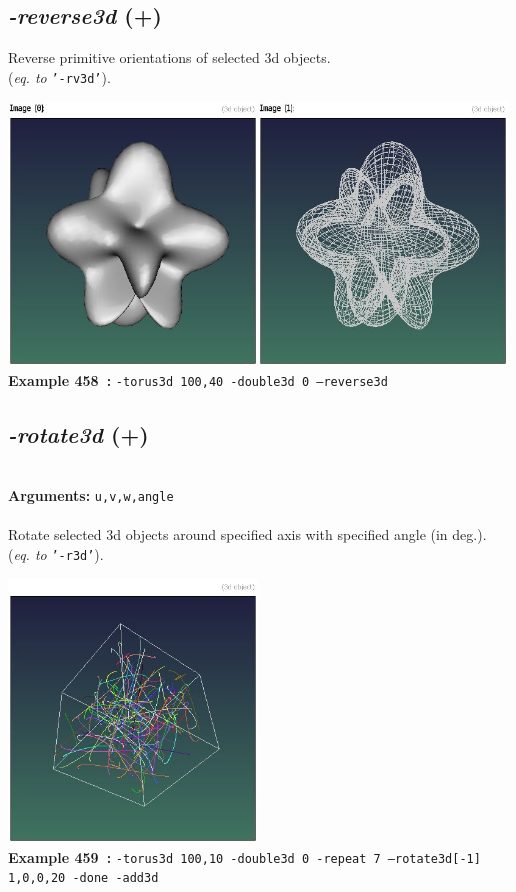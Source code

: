 \documentclass[a4paper,11pt,twoside]{book}
\begin{document}
\subsection{\emph{-reverse3d} (+)}\vspace*{-0.5em}
Reverse primitive orientations of selected 3d objects.
~\\(\emph{eq. to} {\small \texttt{'-rv3d'}}).
\begin{center}\includegraphics[keepaspectratio=true,height=7cm,width=\textwidth]{img/gmic_def458.jpg}\\
{\footnotesize \textbf{Example 458~:} \texttt{-torus3d 100,40 -double3d 0 --reverse3d}}
\end{center}

\subsection{\emph{-rotate3d} (+)}\vspace*{-0.5em}
~\\\textbf{Arguments: } 
{\small \texttt{u,v,w,angle}}\\~\\
Rotate selected 3d objects around specified axis with specified angle (in deg.).
~\\(\emph{eq. to} {\small \texttt{'-r3d'}}).
\begin{center}\includegraphics[keepaspectratio=true,height=7cm,width=\textwidth]{img/gmic_def459.jpg}\\
{\footnotesize \textbf{Example 459~:} \texttt{-torus3d 100,10 -double3d 0 -repeat 7 --rotate3d[-1] 1,0,0,20 -done -add3d}}
\end{center}
\end{document}
